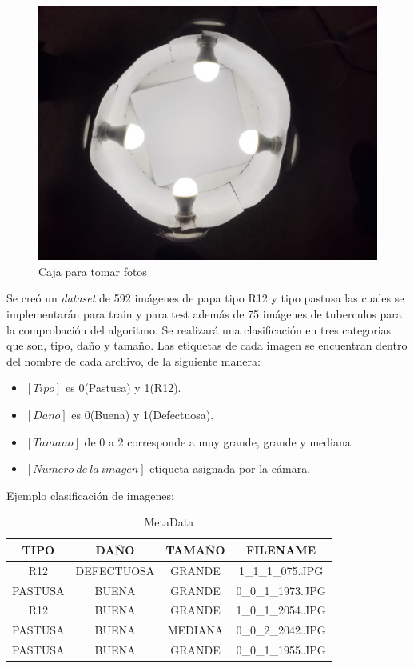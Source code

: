 	\begin{figure}[ht]
		\centering
		\includegraphics[scale=0.2]{Figs/Chamber.JPEG}
		\caption{Caja para tomar fotos}
		\label{fig:chamber}
	\end{figure}

\newpage
	Se creó un \textit{dataset} de 592 imágenes de papa tipo R12 y tipo pastusa las cuales se implementarán para train y para test además de 75 imágenes de tuberculos para la comprobación del algoritmo. Se realizará una clasificación en tres categorias que son, tipo, daño y tamaño. Las etiquetas de cada imagen se encuentran dentro del nombre de cada archivo, de la siguiente manera:

	\begin{itemize}
		\item $[Tipo]$ es 0(Pastusa) y 1(R12).
		\item $[Dano]$ es 0(Buena) y 1(Defectuosa).
		\item $[Tamano]$ de 0 a 2 corresponde a muy grande, grande y mediana.
		\item $[Numero \ de \ la \ imagen]$ etiqueta asignada por la cámara.
	\end{itemize}

	Ejemplo clasificación de imagenes:
	
	\begin{table}[ht]
		\centering
		\begin{tabular}{|c|c|c|c|}
			\hline
			TIPO & DAÑO & TAMAÑO & FILENAME \\
			\hline
			R12 & DEFECTUOSA & GRANDE & 1\_1\_1\_075.JPG \\
			\hline
			PASTUSA & BUENA & GRANDE & 0\_0\_1\_1973.JPG \\
			\hline
			R12 & BUENA & GRANDE & 1\_0\_1\_2054.JPG \\
			\hline
			PASTUSA & BUENA & MEDIANA & 0\_0\_2\_2042.JPG \\
			\hline
			PASTUSA & BUENA & GRANDE & 0\_0\_1\_1955.JPG \\
			\hline
		\end{tabular}	
		\caption{MetaData}
		\label{table:metadata}
	\end{table}

